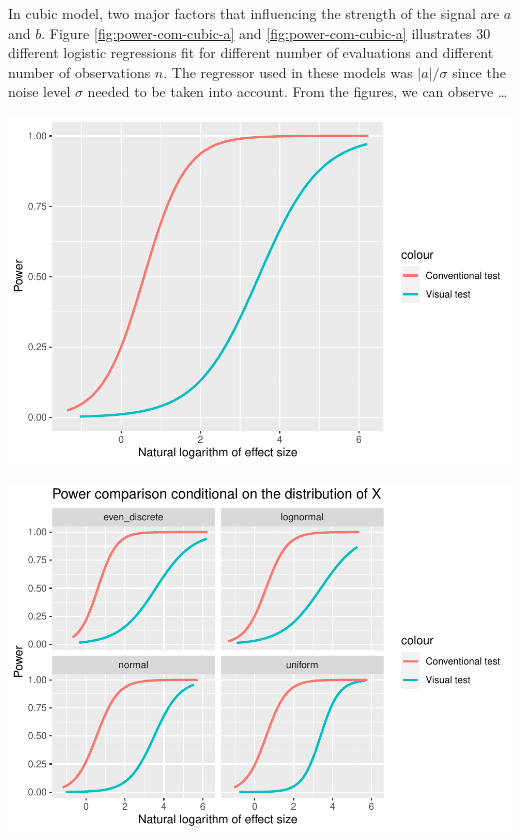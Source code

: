 \documentclass[]{interact}
\theoremstyle{plain}%
\theoremstyle{definition}
\theoremstyle{remark}
\begin{document}
In cubic model, two major factors that influencing the strength of the
signal are \(a\) and \(b\). Figure \ref{fig:power-com-cubic-a} and
\ref{fig:power-com-cubic-a} illustrates 30 different logistic
regressions fit for different number of evaluations and different number
of observations \(n\). The regressor used in these models was
\(|a|/\sigma\) since the noise level \(\sigma\) needed to be taken into
account. From the figures, we can observe \ldots{}

\includegraphics{paper_comparison_files/figure-latex/power-vs-log-effect-size-1.pdf}

\includegraphics{paper_comparison_files/figure-latex/power-vs-log-effect-size-given-x-dist-1.pdf}
\end{document}
